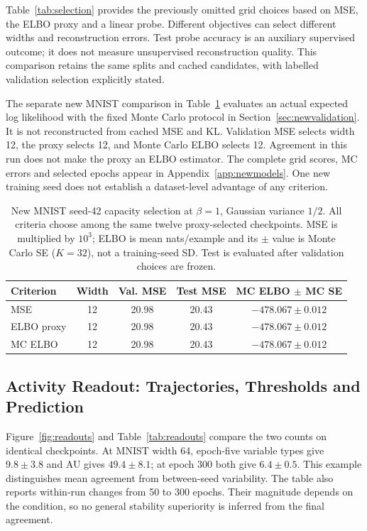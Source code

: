 \documentclass[make,article,submit,pdftex,moreauthors]{Definitions/mdpi}
\begin{document}
Table~\ref{tab:selection} provides the previously omitted grid choices
based on MSE, the ELBO proxy and a linear probe. Different objectives can
select different widths and reconstruction errors. Test probe accuracy
is an auxiliary supervised outcome; it does not measure unsupervised
reconstruction quality. This comparison retains the same splits and
cached candidates, with labelled validation selection explicitly stated.

The separate new MNIST comparison in Table~\ref{tab:mcselection}
evaluates an actual expected log likelihood with the fixed Monte Carlo
protocol in Section~\ref{sec:newvalidation}. It is not reconstructed
from cached MSE and KL. Validation MSE selects width 12, the proxy selects 12, and Monte Carlo ELBO selects 12. Agreement in this run does not make the proxy an ELBO estimator.
The complete grid scores, MC errors and selected epochs appear in
Appendix~\ref{app:newmodels}. One new training seed does not establish
a dataset-level advantage of any criterion.

\begin{table}[H]
\caption{New MNIST seed-42 capacity selection at $\beta=1$, Gaussian variance $1/2$. All criteria choose among the same twelve proxy-selected checkpoints. MSE is multiplied by $10^3$; ELBO is mean nats/example and its $\pm$ value is Monte Carlo SE ($K=32$), not a training-seed SD. Test is evaluated after validation choices are frozen.}\label{tab:mcselection}
\small
\setlength{\tabcolsep}{3pt}
\begin{tabular*}{\textwidth}{@{\extracolsep{\fill}}lcccc@{}}
\toprule
Criterion & Width & Val. MSE & Test MSE & MC ELBO $\pm$ MC SE \\
\midrule
MSE & 12 & 20.98 & 20.43 & $-478.067 \pm 0.012$ \\
ELBO proxy & 12 & 20.98 & 20.43 & $-478.067 \pm 0.012$ \\
MC ELBO & 12 & 20.98 & 20.43 & $-478.067 \pm 0.012$ \\
\bottomrule\end{tabular*}
\end{table}


\subsection{Activity Readout: Trajectories, Thresholds and Prediction}\label{sec:au}
Figure~\ref{fig:readouts} and Table~\ref{tab:readouts} compare the two
counts on identical checkpoints. At MNIST width 64, epoch-five variable
types give $9.8\pm3.8$ and AU gives $49.4\pm8.1$; at epoch 300 both
give $6.4\pm0.5$. This example distinguishes mean agreement from
between-seed variability. The table also reports within-run changes from
50 to 300 epochs. Their magnitude depends on the condition, so no
general stability superiority is inferred from the final agreement.
\end{document}
